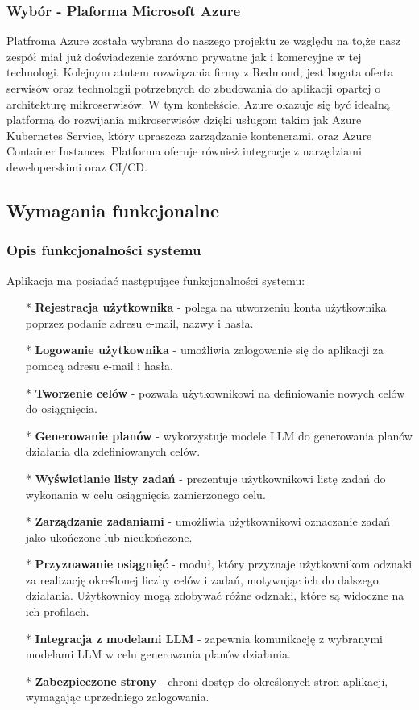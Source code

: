 \subsubsection{Wybór - Plaforma Microsoft Azure}
\clearpage
Platfroma Azure została wybrana do naszego projektu ze względu na to,że nasz zespół miał już doświadczenie zarówno prywatne jak i komercyjne w tej technologi. Kolejnym atutem rozwiązania firmy z Redmond, jest bogata oferta serwisów oraz technologii potrzebnych do zbudowania do aplikacji opartej o architekturę mikroserwisów.
W tym kontekście, Azure okazuje się być idealną platformą do rozwijania mikroserwisów dzięki usługom takim jak Azure Kubernetes Service, który upraszcza zarządzanie kontenerami, oraz Azure Container Instances. Platforma oferuje również integracje z narzędziami deweloperskimi oraz CI/CD.

\subsection{Wymagania funkcjonalne}

\subsubsection{Opis funkcjonalności systemu}

\noindent Aplikacja ma posiadać następujące funkcjonalności systemu:
\begin{enumerate}
    \item[*] {\bf Rejestracja użytkownika} - polega na utworzeniu konta użytkownika poprzez podanie adresu e-mail, nazwy i hasła.
    \item[*] {\bf Logowanie użytkownika} - umożliwia zalogowanie się do aplikacji za pomocą adresu e-mail i hasła.
    \item[*] {\bf Tworzenie celów} - pozwala użytkownikowi na definiowanie nowych celów do osiągnięcia.
    \item[*] {\bf Generowanie planów} - wykorzystuje modele LLM do generowania planów działania dla zdefiniowanych celów.
    \item[*] {\bf Wyświetlanie listy zadań} - prezentuje użytkownikowi listę zadań do wykonania w celu osiągnięcia zamierzonego celu.
    \item[*] {\bf Zarządzanie zadaniami} - umożliwia użytkownikowi oznaczanie zadań jako ukończone lub nieukończone.
    \item[*] {\bf Przyznawanie osiągnięć} - moduł, który przyznaje użytkownikom odznaki za realizację określonej liczby celów i zadań, motywując ich do dalszego działania. Użytkownicy mogą zdobywać różne odznaki, które są widoczne na ich profilach.
    \item[*] {\bf Integracja z modelami LLM} - zapewnia komunikację z wybranymi modelami LLM w celu generowania planów działania.
    \item[*] {\bf Zabezpieczone strony} - chroni dostęp do określonych stron aplikacji, wymagając uprzedniego zalogowania.
\end{enumerate}

